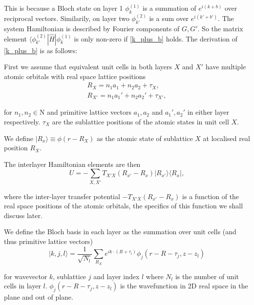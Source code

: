 \documentclass[12pt]{report} %
\begin{document}
  This is because a Bloch state on layer 1 $\phi_k^{(1)}$ is a summation of $e^{i(k+b)}$ over reciprocal vectors. Similarily, on layer two $\phi_{k'}^{(2)}$ is a sum over $e^{i(k'+b')}$. The system Hamiltonian is described by Fourier components of $G, G'$. So the matrix element $\langle \phi_{k'}^{(2)} | \hat{H} | \phi_{k}^{(1)}$ is only non-zero if \ref{k_plus_b} holds. The derivation of \ref{k_plus_b} is as follows:

  First we assume that equivalent unit cells in both layers $X$ and $X'$ have multiple atomic orbitals with real space lattice positions
  \begin{equation}
    \begin{gathered}
    R_X = n_1 a_1 + n_2 a_2 + \tau_X,\\
    R_{X'} = n_1 a_1' + n_2 a_2' + \tau_{X'},
    \end{gathered}
    \label{inter-layer_real_sublattice_positions}
  \end{equation}

  for $n_1, n_2 \in \mathrm{N}$ and primitive lattice vectors $a_1, a_2$ and $a_1', a_2'$ in either layer respectively. $\tau_X$ are the sublattice positions of the atomic states in unit cell $X$.

  We define $| R_x \rangle \equiv \phi(r - R_X)$ as the atomic state of sublattice $X$ at localised real position $R_X$.

  The interlayer Hamiltonian elements are then
  \begin{equation}
    U = -\sum_{X, X'} T_{X'X}(R_{x'} - R_x) |R_{x'}\rangle \langle R_x|,
    \label{inter-layer_hamiltonian_elements}
  \end{equation}

  where the inter-layer transfer potential $-T_{X'X}(R_{x'} - R_x)$ is a function of the real space positions of the atomic orbitals, the specifics of this function we shall discuss later.

  We define the Bloch basis in each layer as the summation over unit cells (and thus primitive lattice vectors)
  \begin{equation}
    | k,j,l \rangle = \frac{1}{\sqrt{N_l}}\sum_{R_X}e^{ik\cdot(R+\tau_i)}\phi_j(r-R-\tau_j, z-z_l)
    \label{inter-layer_real_bloch_basis}
  \end{equation}

  for wavevector $k$, sublattice $j$ and layer index $l$ where $N_l$ is the number of unit cells in layer $l$. $\phi_j (r - R - \tau_j, z-z_l)$ is the wavefunction in 2D real space in the plane and out of plane.
\end{document}
